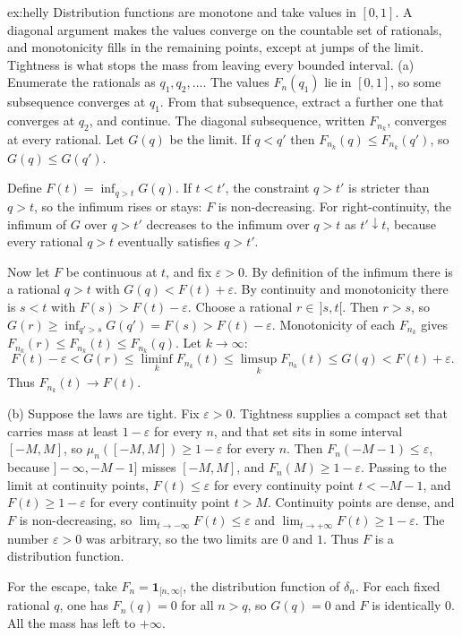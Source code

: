 \begin{solution}{ex:helly}
\idea Distribution functions are monotone and take values in $[0,1]$. A diagonal argument makes the values converge on the countable set of
rationals, and monotonicity fills in the remaining points, except at jumps of the limit. Tightness is what stops the mass from leaving every
bounded interval.
\writeup (a) Enumerate the rationals as $q_1,q_2,\ldots$. The values $F_n(q_1)$ lie in $[0,1]$, so some subsequence converges at $q_1$. From
that subsequence, extract a further one that converges at $q_2$, and continue. The diagonal subsequence, written $F_{n_k}$, converges at every
rational. Let $G(q)$ be the limit. If $q<q'$ then $F_{n_k}(q)\le F_{n_k}(q')$, so $G(q)\le G(q')$.

Define $F(t)=\inf_{q>t}G(q)$. If $t<t'$, the constraint $q>t'$ is stricter than $q>t$, so the infimum rises or stays: $F$ is non-decreasing.
For right-continuity, the infimum of $G$ over $q>t'$ decreases to the infimum over $q>t$ as $t'\downarrow t$, because every rational $q>t$
eventually satisfies $q>t'$.

Now let $F$ be continuous at $t$, and fix $\varepsilon>0$. By definition of the infimum there is a rational $q>t$ with $G(q)<F(t)+\varepsilon$. By
continuity and monotonicity there is $s<t$ with $F(s)>F(t)-\varepsilon$. Choose a rational $r\in\,]s,t[$. Then $r>s$, so
$G(r)\ge\inf_{q'>s}G(q')=F(s)>F(t)-\varepsilon$. Monotonicity of each $F_{n_k}$ gives $F_{n_k}(r)\le F_{n_k}(t)\le F_{n_k}(q)$. Let $k\to\infty$:
\[F(t)-\varepsilon<G(r)\le\liminf_k F_{n_k}(t)\le\limsup_k F_{n_k}(t)\le G(q)<F(t)+\varepsilon.\]
Thus $F_{n_k}(t)\to F(t)$.

(b) Suppose the laws are tight. Fix $\varepsilon>0$. Tightness supplies a compact set that carries mass at least $1-\varepsilon$ for every $n$, and that set sits in some interval $[-M,M]$, so $\mu_n([-M,M])\ge 1-\varepsilon$ for every $n$. Then $F_n(-M-1)\le\varepsilon$, because $]-\infty,-M-1]$ misses $[-M,M]$, and
$F_n(M)\ge 1-\varepsilon$. Passing to the limit at continuity points, $F(t)\le\varepsilon$ for every continuity point $t<-M-1$, and $F(t)\ge 1-\varepsilon$
for every continuity point $t>M$. Continuity points are dense, and $F$ is non-decreasing, so $\lim_{t\to-\infty}F(t)\le\varepsilon$ and
$\lim_{t\to+\infty}F(t)\ge 1-\varepsilon$. The number $\varepsilon>0$ was arbitrary, so the two limits are $0$ and $1$. Thus $F$ is a distribution function.

For the escape, take $F_n=\mathbf 1_{[n,\infty[}$, the distribution function of $\delta_n$. For each fixed rational $q$, one has $F_n(q)=0$ for
all $n>q$, so $G(q)=0$ and $F$ is identically $0$. All the mass has left to $+\infty$.
\end{solution}


